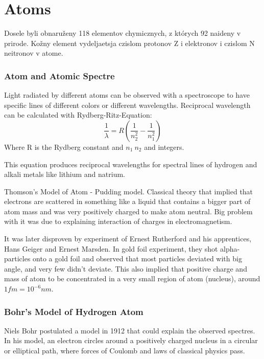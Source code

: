 \documentclass{report}
\begin{document}
\part{Atoms}
Dosele byli obnaruženy 118 elementov chymicznych, z których 92 naideny v prirode. Kožny element vydeljaetsja czislom protonov Z i elektronov i czislom N neitronov v atome. 
\section{Atom and Atomic Spectre}
Light radiated by different atoms can be observed with a spectroscope to have specific lines of different colors or different wavelengths. Reciprocal wavelength can be calculated with Rydberg-Ritz-Equation:
\begin{equation}
    \frac{1}{\lambda} = R \left(\frac{1}{n_2^2} - \frac{1}{n_1^2} \right)
\end{equation}
Where R is the Rydberg constant and $n_1 \> n_2 $ and integers.

This equation produces reciprocal wavelengths for spectral lines of hydrogen and alkali metals like lithium and natrium. 

Thomson's Model of Atom - Pudding model. Classical theory that implied that electrons are scattered in something like a liquid that contains a bigger part of atom mass and was very positively charged to make atom neutral. Big problem with it was due to explaining interaction of charges in electromagnetism.

It was later disproven by experiment of Ernest Rutherford and his apprentices, Hans Geiger and Ernest Marsden. In gold foil experiment, they shot alpha-particles onto a gold foil and observed that most particles deviated with big angle, and very few didn't deviate. This also implied that positive charge and mass of atom to be concentrated in a very small region of atom (nucleus), around $1 fm = 10^{-6} nm$.

\section{Bohr's Model of Hydrogen Atom}
Niels Bohr postulated a model in 1912 that could explain the observed spectres. In his model, an electron circles around a positively charged nucleus in a circular or elliptical path, where forces of Coulomb and laws of classical physics pass. 
\end{document}
